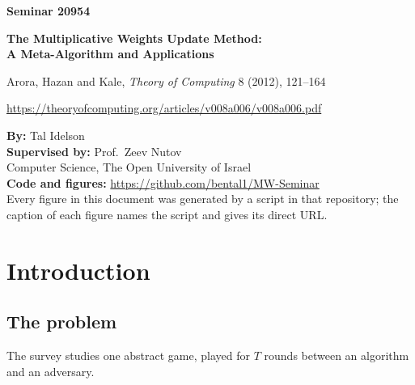 \documentclass[11pt,a4paper]{article}
\theoremstyle{plain}
\theoremstyle{definition}
\newcommand{\repo}{https://github.com/bental1/MW-Seminar}
\begin{document}
\begin{titlepage}
\vspace*{2.2cm}
{\Huge\bfseries Seminar 20954\par}
\vspace{0.6cm}
{\Large\bfseries The Multiplicative Weights Update Method:\\A Meta-Algorithm and Applications\par}
\vspace{0.4cm}
{\large Arora, Hazan and Kale, \emph{Theory of Computing} 8 (2012), 121--164 \cite{AHK12}\par}
\vspace{0.2cm}
\url{https://theoryofcomputing.org/articles/v008a006/v008a006.pdf}

\vfill
{\large
\textbf{By:} Tal Idelson\\[3pt]
\textbf{Supervised by:} Prof.\ Zeev Nutov\\[3pt]
Computer Science, The Open University of Israel\\[12pt]
\textbf{Code and figures:} \url{\repo} \cite{Repo}\\
Every figure in this document was generated by a script in that repository; the caption of each figure names the script and gives its direct URL.
}
\end{titlepage}

\tableofcontents
\clearpage

\section{Introduction}

\subsection{The problem}
\label{sec:problem}

The survey studies one abstract game, played for $T$ rounds between an algorithm and an adversary.
\end{document}
